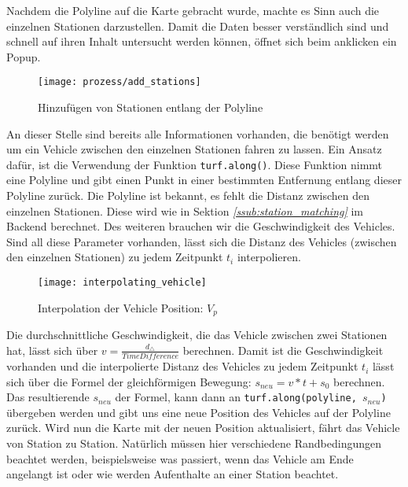 \begin{newpage}
    Nachdem die Polyline auf die Karte gebracht wurde, machte es Sinn auch die einzelnen Stationen darzustellen. Damit die Daten besser verständlich sind und schnell auf ihren Inhalt untersucht werden können, öffnet sich beim anklicken ein Popup.

    \begin{figure}[htbp]
      \begin{center}
        \texttt{[image: prozess/add\_stations]}
        \caption{Hinzufügen von Stationen entlang der Polyline}
        \label{fig:prozess/add_stations}
      \end{center}
    \end{figure}

    An dieser Stelle sind bereits alle Informationen vorhanden, die benötigt werden um ein Vehicle zwischen den einzelnen Stationen fahren zu lassen. Ein Ansatz dafür, ist die Verwendung der Funktion \texttt{turf.along()}. Diese Funktion nimmt eine Polyline und gibt einen Punkt in einer bestimmten Entfernung entlang dieser Polyline zurück. Die Polyline ist bekannt, es fehlt die Distanz zwischen den einzelnen Stationen. Diese wird wie in Sektion \textit{\ref{ssub:station_matching} } im Backend berechnet. Des weiteren brauchen wir die Geschwindigkeit des Vehicles. Sind all diese Parameter vorhanden, lässt sich die Distanz des Vehicles (zwischen den einzelnen Stationen) zu jedem Zeitpunkt $t_i$ interpolieren.

    \begin{figure}[htbp]
      \begin{center}
        \texttt{[image: interpolating\_vehicle]}
        \caption{Interpolation der Vehicle Position: $V_p$}
        \label{fig:interpolating_vehicle}
      \end{center}
    \end{figure}

    Die durchschnittliche Geschwindigkeit, die das Vehicle zwischen zwei Stationen hat, lässt sich über $v = \frac{d_\triangle}{TimeDifference}$ berechnen. Damit ist die Geschwindigkeit vorhanden und die interpolierte Distanz des Vehicles zu jedem Zeitpunkt $t_i$ lässt sich über die Formel der gleichförmigen Bewegung: $s_{neu} = v * t + s_0$ berechnen. Das resultierende $s_{neu}$ der Formel, kann dann an \texttt{turf.along(polyline, $s_{neu}$)} übergeben werden und gibt uns eine neue Position des Vehicles auf der Polyline zurück. Wird nun die Karte mit der neuen Position aktualisiert, fährt das Vehicle von Station zu Station. Natürlich müssen hier verschiedene Randbedingungen beachtet werden, beispielsweise was passiert, wenn das Vehicle am Ende angelangt ist oder wie werden Aufenthalte an einer Station beachtet.

    

    

\end{newpage}